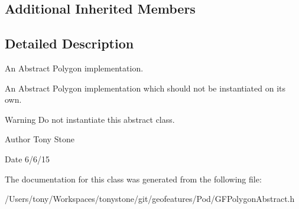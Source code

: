 \subsection*{Additional Inherited Members}


\subsection{Detailed Description}
An Abstract Polygon implementation. 

An Abstract Polygon implementation which should not be instantiated on it\textquotesingle{}s own.

\begin{DoxyWarning}{Warning}
Do not instantiate this abstract class.
\end{DoxyWarning}
\begin{DoxyAuthor}{Author}
Tony Stone 
\end{DoxyAuthor}
\begin{DoxyDate}{Date}
6/6/15 
\end{DoxyDate}


The documentation for this class was generated from the following file\+:\begin{DoxyCompactItemize}
\item 
/\+Users/tony/\+Workspaces/tonystone/git/geofeatures/\+Pod/G\+F\+Polygon\+Abstract.\+h\end{DoxyCompactItemize}
